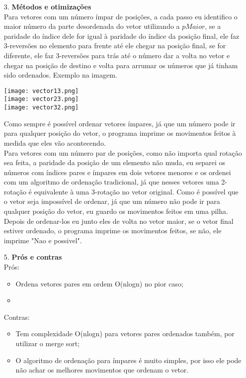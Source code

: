 \documentclass[12pt, a4paper]{article} %
\begin{document}
\begin{enumerate}
\begin{itemize}
\end{itemize}
\large
\item[3.]\textbf{Métodos e otimizações}
\normalsize\\[0.5cm]
Para vetores com um número ímpar de posições, a cada passo eu identifico o maior número da parte desordenada do vetor utilizando a $pMaior$, se a paridade do índice dele for igual à paridade do índice da posição final, ele faz 3-reversões no elemento para frente até ele chegar na posição final, se for diferente, ele faz 3-reversões para trás até o número dar a volta no vetor e chegar na posição de destino e volta para arrumar os números que já tinham sido ordenados. Exemplo na imagem.
\small
\begin{center}
\texttt{[image: vector13.png]}\\
\texttt{[image: vector23.png]}\\
\texttt{[image: vector32.png]}\\
\end{center}
\normalsize
Como sempre é possível ordenar vetores ímpares, já que um número pode ir para qualquer posição do vetor, o programa imprime os movimentos feitos à medida que eles vão acontecendo.\\
Para vetores com um número par de posições, como não importa qual rotação sea feita, a paridade da posição de um elemento não muda, eu separei os números com índices pares e ímpares em dois vetores menores e os ordenei com um algoritmo de ordenação tradicional, já que nesses vetores uma 2-rotação é equivalente à uma 3-rotação no vetor original. Como é possível que o vetor seja impossível de ordenar, já que um número não pode ir para qualquer posição do vetor, eu guardo os movimentos feitos em uma pilha. Depois de ordenar-los eu junto eles de volta no vetor maior, se o vetor final estiver ordenado, o programa imprime os movimentos feitos, se não, ele imprime "Nao e possivel".\\[0.5cm]
\large
\item[5.]\textbf{Prós e contras}
\normalsize\\[0.5cm]
Prós:
\begin{itemize}
\item Ordena vetores pares em ordem O(nlogn) no pior caso;
\item 
\end{itemize}
Contras:
\begin{itemize}
\item Tem complexidade O(nlogn) para vetores pares ordenados também, por utilizar o merge sort;
\item O algoritmo de ordenação para ímpares é muito simples, por isso ele pode não achar os melhores movimentos que ordenam o vetor.
\end{itemize}
\end{enumerate}
\end{document}
